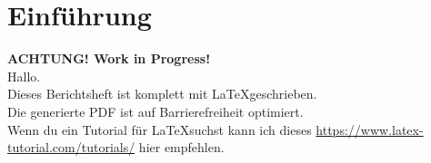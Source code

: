 \section{Einführung}
\textbf{ACHTUNG! Work in Progress!}\\
Hallo.\\
Dieses Berichtsheft ist komplett mit \LaTeX geschrieben.\\
Die generierte PDF ist auf Barrierefreiheit optimiert.\\
Wenn du ein Tutorial für \LaTeX suchst kann ich dieses \url{https://www.latex-tutorial.com/tutorials/} hier empfehlen.\\
\vspace{\fill}
  
%
\newpage
